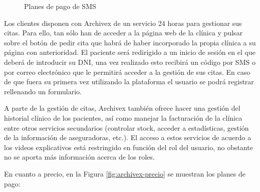 \begin{figure}[H]
    \caption{Planes de pago de SMS}
    \label{fig:archivex-sms}
\end{figure}

Los clientes disponen con Archivex de un servicio 24 horas para gestionar sus citas. Para ello, tan sólo han de acceder a la página web de la clínica y pulsar sobre el botón de pedir cita que habrá de haber incorporado la propia clínica a su página con anterioridad. El paciente será redirigido a un inicio de sesión en el que deberá de introducir su DNI, una vez realizado esto recibirá un código por SMS o por correo electrónico que le permitirá acceder a la gestión de sus citas. En caso de que fuera su primera vez utilizando la plataforma el usuario se podrá registrar rellenando un formulario. \bigskip

A parte de la gestión de citas, Archivex también ofrece hacer una gestión del historial clínico de los pacientes, así como manejar la facturación de la clínica entre otros servicios secundarios (controlar stock, acceder a estadísticas, gestión de la información de aseguradoras, etc.). El acceso a estos servicios de acuerdo a los videos explicativos está restringido en función del rol del usuario, no obstante no se aporta más información acerca de los roles. \bigskip

En cuanto a precio, en la Figura \ref{fig:archivex-precio} se muestran los planes de pago:

